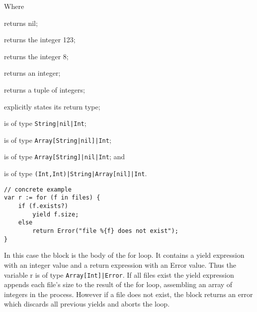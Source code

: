 Where \begin{exdesc}
    \item returns nil;
    \item returns the integer 123;
    \item returns the integer 8;
    \item returns an integer;
    \item returns a tuple of integers;
    \item explicitly states its return type;
    \item is of type \lstinline{String|nil|Int};
    \item is of type \lstinline{Array[String|nil]|Int};
    \item is of type \lstinline{Array[String]|nil|Int}; and
    \item is of type \lstinline{(Int,Int)|String|Array[nil]|Int}.
\end{exdesc}

\begin{lstlisting}
// concrete example
var r := for (f in files) {
    if (f.exists?)
        yield f.size;
    else
        return Error("file %{f} does not exist");
}
\end{lstlisting}

In this case the block is the body of the for loop. It contains a yield
expression with an integer value and a return expression with an Error value.
Thus the variable r is of type \lstinline{Array[Int]|Error}. If all files exist
the yield expression appends each file's size to the result of the for loop,
assembling an array of integers in the process. However if a file does not
exist, the block returns an error which discards all previous yields and aborts
the loop.
